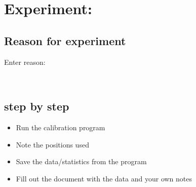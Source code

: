 \section{Experiment:}



\subsection{Reason for experiment}

\begin{Form}
Enter reason: \vspace{3mm} 

\TextField[
  name=reason,
  multiline=true,
  width=10cm,
  height=4cm
]{}

\end{Form}\\


\subsection{step by step} 
\begin{itemize}
    \item Run the calibration program
    \item Note the positions used
    \item Save the data/statistics from the program
    \item Fill out the document with the data and your own notes
\end{itemize}
    
